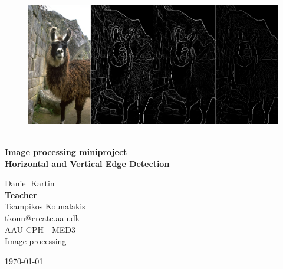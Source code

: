 \begin{titlepage}
			
\addtolength{\voffset}{2cm}

\begin{figure}[H]
\centering
\vspace{2cm}	%
\includegraphics[width=0.99\linewidth]{figure/Frontpage/frontpage.png}
\end{figure}

\mbox{}
\vfill
\renewcommand{\familydefault}{\sfdefault} \normalfont %
\HRule\\[0.2cm]
\textbf{{\small Image processing miniproject\\ \Huge  Horizontal and Vertical Edge Detection}}\\
\HRule\medskip{}
\begin{multicols}{2}
{\Large Daniel Kartin\columnbreak}\\
\setlength{\parskip}{2.4cm}
\Large{\textbf{Teacher}\\Tsampikos Kounalakis\\\href{mailto:tkoun@create.aau.dk }{tkoun@create.aau.dk}}
\\\small AAU CPH - 
MED3 \\
Image processing\\
\end{multicols}
\today
\renewcommand{\familydefault}{\rmdefault} \normalfont %
\end{titlepage}


